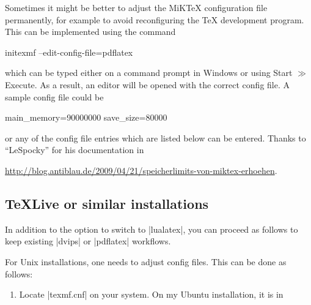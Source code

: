 {Sometimes it might be better to adjust the MiK\TeX{} configuration file
permanently, for example to avoid reconfiguring the \TeX{} development program.
This can be implemented using the command
%
\begin{codeexample}
initexmf --edit-config-file=pdflatex
\end{codeexample}
%
\noindent which can be typed either on a command prompt in Windows or using
Start $\gg$ Execute. As a result, an editor will be opened with the correct
config file. A sample config file could be
%
\begin{codeexample}
main_memory=90000000
save_size=80000
\end{codeexample}
%
or any of the config file entries which are listed below can be entered.
Thanks to ``LeSpocky'' for his documentation in

\url{http://blog.antiblau.de/2009/04/21/speicherlimits-von-miktex-erhoehen}.


\subsection{\TeX{}Live or similar installations}

In addition to the option to switch to |lualatex|, you can proceed as follows
to keep existing |dvips| or |pdflatex| workflows.

For Unix installations, one needs to adjust config files. This can be done as
follows:
%
\begin{enumerate}
    \item Locate |texmf.cnf| on your system. On my Ubuntu installation, it is
        in


\end{enumerate}}
